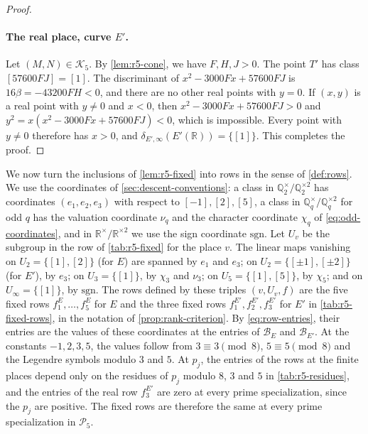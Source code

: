 \documentclass[12pt,oneside,openany]{book}
\theoremstyle{definition}
\theoremstyle{plain}
\numberwithin{equation}{chapter}
\theoremstyle{plain}
\theoremstyle{definition}
\theoremstyle{remark}
\newcommand{\Q}{\mathbb Q}
\newcommand{\R}{\mathbb R}
\newcommand{\sq}[1]{[#1]}
\newcommand{\sqgp}[1]{#1^{\times}/#1^{\times2}}
\newcommand{\cB}{\mathcal B}
\newcommand{\cP}{\mathcal P}
\newcommand{\cK}{\mathcal K}
\begin{document}
\begin{proof}
\paragraph{The real place, curve $E'$.} Let $(M,N)\in\cK_5$. By \cref{lem:r5-cone}, we have $F,H,J>0$. The point $T'$ has class $\sq{57600FJ}=\sq1$. The discriminant of $x^2-3000Fx+57600FJ$ is $16\beta=-43200FH<0$, and there are no other real points with $y=0$. If $(x,y)$ is a real point with $y\ne0$ and $x<0$, then $x^2-3000Fx+57600FJ>0$ and $y^2=x(x^2-3000Fx+57600FJ)<0$, which is impossible. Every point with $y\ne0$ therefore has $x>0$, and $\delta_{E',\infty}(E'(\R))=\{\sq1\}$. This completes the proof.
\end{proof}

We now turn the inclusions of \cref{lem:r5-fixed} into rows in the sense of \cref{def:rows}. We use the coordinates of \cref{sec:descent-conventions}: a class in $\sqgp{\Q_2}$ has coordinates $(e_1,e_2,e_3)$ with respect to $\sq{-1},\sq2,\sq5$, a class in $\sqgp{\Q_q}$ for odd $q$ has the valuation coordinate $\nu_q$ and the character coordinate $\chi_q$ of \eqref{eq:odd-coordinates}, and in $\sqgp\R$ we use the sign coordinate $\mathrm{sgn}$. Let $U_v$ be the subgroup in the row of \cref{tab:r5-fixed} for the place $v$. The linear maps vanishing on $U_2=\{\sq1,\sq2\}$ (for $E$) are spanned by $e_1$ and $e_3$; on $U_2=\{\sq{\pm1},\sq{\pm2}\}$ (for $E'$), by $e_3$; on $U_3=\{\sq1\}$, by $\chi_3$ and $\nu_3$; on $U_5=\{\sq1,\sq5\}$, by $\chi_5$; and on $U_\infty=\{\sq1\}$, by $\mathrm{sgn}$. The rows defined by these triples $(v,U_v,f)$ are the five fixed rows $f^E_1,\dots,f^E_5$ for $E$ and the three fixed rows $f^{E'}_1,f^{E'}_2,f^{E'}_3$ for $E'$ in \cref{tab:r5-fixed-rows}, in the notation of \cref{prop:rank-criterion}. By \eqref{eq:row-entries}, their entries are the values of these coordinates at the entries of $\cB_E$ and $\cB_{E'}$. At the constants $-1,2,3,5$, the values follow from $3\equiv3\pmod8$, $5\equiv5\pmod8$ and the Legendre symbols modulo $3$ and $5$. At $p_j$, the entries of the rows at the finite places depend only on the residues of $p_j$ modulo $8$, $3$ and $5$ in \cref{tab:r5-residues}, and the entries of the real row $f^{E'}_3$ are zero at every prime specialization, since the $p_j$ are positive. The fixed rows are therefore the same at every prime specialization in $\cP_5$.
\end{document}
